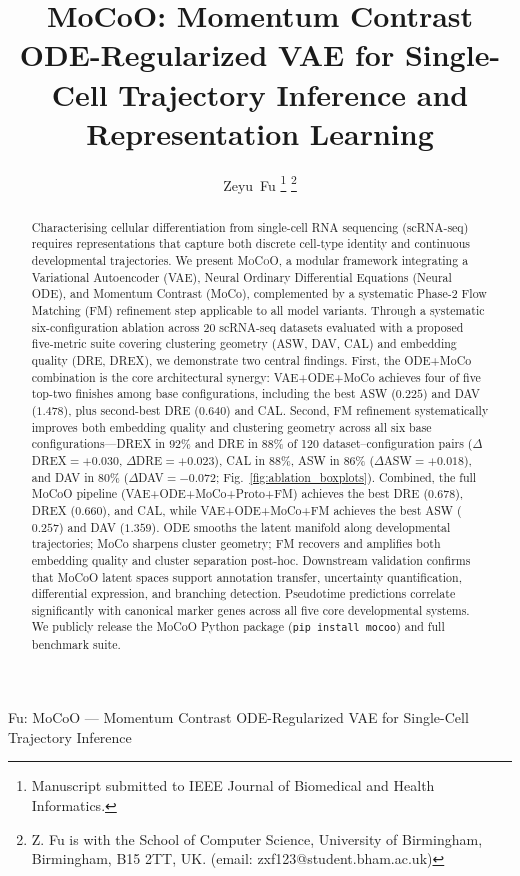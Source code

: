 \documentclass[journal]{IEEEtran}
\newcommand{\MoCoO}{\textsc{MoCoO}\xspace}
\begin{document}
\title{MoCoO: Momentum Contrast ODE-Regularized VAE for Single-Cell Trajectory Inference and Representation Learning}

\author{Zeyu~Fu%
\thanks{Manuscript submitted to IEEE Journal of Biomedical and Health Informatics.}%
\thanks{Z. Fu is with the School of Computer Science, University of Birmingham, Birmingham, B15 2TT, UK. (email: zxf123@student.bham.ac.uk)}
}

%
{Fu: MoCoO --- Momentum Contrast ODE-Regularized VAE for Single-Cell Trajectory Inference}

\maketitle

\begin{abstract}
Characterising cellular differentiation from single-cell RNA sequencing (scRNA-seq) requires representations that capture both discrete cell-type identity and continuous developmental trajectories. We present \MoCoO, a modular framework integrating a Variational Autoencoder (VAE), Neural Ordinary Differential Equations (Neural ODE), and Momentum Contrast (MoCo), complemented by a systematic Phase-2 Flow Matching (FM) refinement step applicable to all model variants. Through a systematic six-configuration ablation across 20 scRNA-seq datasets evaluated with a proposed five-metric suite covering clustering geometry (ASW, DAV, CAL) and embedding quality (DRE, DREX), we demonstrate two central findings. First, the ODE+MoCo combination is the core architectural synergy: VAE+ODE+MoCo achieves four of five top-two finishes among base configurations, including the best ASW ($0.225$) and DAV ($1.478$), plus second-best DRE ($0.640$) and CAL. Second, FM refinement systematically improves both embedding quality and clustering geometry across all six base configurations---DREX in 92\% and DRE in 88\% of 120 dataset--configuration pairs ($\Delta$DREX$=+0.030$, $\Delta$DRE$=+0.023$), CAL in 88\%, ASW in 86\% ($\Delta$ASW$=+0.018$), and DAV in 80\% ($\Delta$DAV$=-0.072$; Fig.~\ref{fig:ablation_boxplots}). Combined, the full MoCoO pipeline (VAE+ODE+MoCo+Proto+FM) achieves the best DRE ($0.678$), DREX ($0.660$), and CAL, while VAE+ODE+MoCo+FM achieves the best ASW ($0.257$) and DAV ($1.359$). ODE smooths the latent manifold along developmental trajectories; MoCo sharpens cluster geometry; FM recovers and amplifies both embedding quality and cluster separation post-hoc. Downstream validation confirms that MoCoO latent spaces support annotation transfer, uncertainty quantification, differential expression, and branching detection. Pseudotime predictions correlate significantly with canonical marker genes across all five core developmental systems. We publicly release the MoCoO Python package (\texttt{pip install mocoo}) and full benchmark suite.
\end{abstract}
\end{document}
